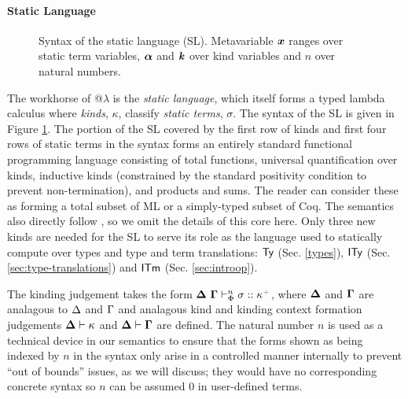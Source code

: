 \documentclass[10pt,preprint]{sigplanconf}
\newcommand{\moutput}{^{\color{gray}+}}
\begin{document}
\paragraph{Static Language}
\begin{figure}[t]
\small
\hspace{-5px}
\caption{Syntax of the static language (SL). Metavariable ${\textbf{\textit{x}}}$ ranges over static term variables, $\boldsymbol{\alpha}$ and $\textbf{\textit{k}}$ over kind variables and $n$ over natural numbers.}\vspace{-5px}
\label{syntax-SL}
\end{figure}
The workhorse of @$\lambda$ is the \emph{static language}, which itself forms a typed lambda calculus where 
\emph{kinds}, $\kappa$, classify \emph{static terms}, $\sigma$.  The syntax of the SL is given in Figure \ref{syntax-SL}. The portion of the SL covered by the first row of kinds and first four rows of static terms in the syntax forms an entirely standard  functional programming language consisting of total functions, universal quantification over kinds, inductive kinds (constrained by the standard positivity condition to prevent non-termination), and products and sums. The reader can consider these as forming a total subset of ML or a simply-typed subset of Coq. The semantics also directly follow \cite{pfpl}, so we  omit the details of this core here.  Only three new  kinds are needed for the SL to serve its role as the language used to  statically compute over types and type and term translations: ${\sf Ty}$ (Sec. \ref{types}), ${\sf ITy}$ (Sec. \ref{sec:type-translations}) and ${\sf ITm}$ (Sec. \ref{sec:introop}). 

The kinding judgement takes the form $\sofkX{\st}{\kappa\moutput}$, where $\boldsymbol\Delta$ and $\boldsymbol\Gamma$ are analagous to $\Delta$ and $\Gamma$ and analagous kind and kinding context formation judgements $\boldsymbol\Delta \vdash \kappa$ and $\boldsymbol\Delta \vdash \boldsymbol\Gamma$ are  defined. The natural number $n$ is used as a technical device in our semantics to ensure that the forms shown as being indexed by $n$ in the syntax only arise in a controlled manner internally to prevent ``out of bounds'' issues, as we will discuss; they would have no corresponding concrete syntax so $n$ can be assumed $0$ in user-defined terms. 
\end{document}
